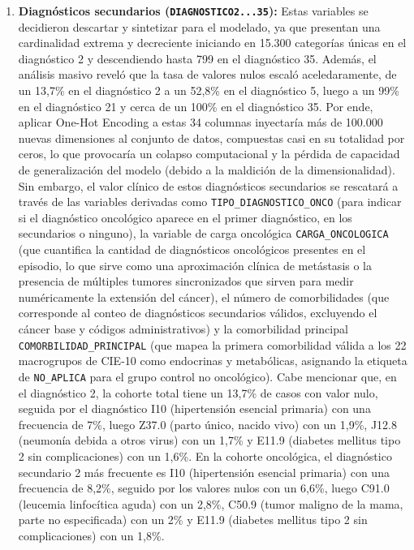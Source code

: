 \begin{enumerate}
    \item \textbf{Diagnósticos secundarios (\texttt{DIAGNOSTICO2...35}):} Estas variables se decidieron descartar y sintetizar para el modelado, ya que presentan una cardinalidad extrema y decreciente iniciando en 15.300 categorías únicas en el diagnóstico 2 y descendiendo hasta 799 en el diagnóstico 35. Además, el análisis masivo reveló que la tasa de valores nulos escaló aceledaramente, de un 13,7\% en el diagnóstico 2 a un 52,8\% en el diagnóstico 5, luego a un 99\% en el diagnóstico 21 y cerca de un 100\% en el diagnóstico 35. Por ende, aplicar One-Hot Encoding a estas 34 columnas inyectaría más de 100.000 nuevas dimensiones al conjunto de datos, compuestas casi en su totalidad por ceros, lo que provocaría un colapso computacional y la pérdida de capacidad de generalización del modelo (debido a la maldición de la dimensionalidad). Sin embargo, el valor clínico de estos diagnósticos secundarios se rescatará a través de las variables derivadas como \texttt{TIPO\_DIAGNOSTICO\_ONCO} (para indicar si el diagnóstico oncológico aparece en el primer diagnóstico, en los secundarios o ninguno), la variable de carga oncológica \texttt{CARGA\_ONCOLOGICA} (que cuantifica la cantidad de diagnósticos oncológicos presentes en el episodio, lo que sirve como una aproximación clínica de metástasis o la presencia de múltiples tumores sincronizados que sirven para medir numéricamente la extensión del cáncer), el número de comorbilidades (que corresponde al conteo de diagnósticos secundarios válidos, excluyendo el cáncer base y códigos administrativos) y la comorbilidad principal \texttt{COMORBILIDAD\_PRINCIPAL} (que mapea la primera comorbilidad válida a los 22 macrogrupos de CIE-10 como endocrinas y metabólicas, asignando la etiqueta de \texttt{NO\_APLICA} para el grupo control no oncológico). Cabe mencionar que, en el diagnóstico 2, la cohorte total tiene un 13,7\% de casos con valor nulo, seguida por el diagnóstico I10 (hipertensión esencial primaria) con una frecuencia de 7\%, luego Z37.0 (parto único, nacido vivo) con un 1,9\%, J12.8 (neumonía debida a otros virus) con un 1,7\% y E11.9 (diabetes mellitus tipo 2 sin complicaciones) con un 1,6\%. En la cohorte oncológica, el diagnóstico secundario 2 más frecuente es I10 (hipertensión esencial primaria) con una frecuencia de 8,2\%, seguido por los valores nulos con un 6,6\%, luego C91.0 (leucemia linfocítica aguda) con un 2,8\%, C50.9 (tumor maligno de la mama, parte no especificada) con un 2\% y E11.9 (diabetes mellitus tipo 2 sin complicaciones) con un 1,8\%.

\end{enumerate}
